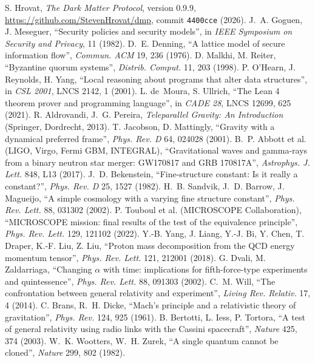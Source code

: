  S. Hrovat, \emph{The Dark Matter Protocol}, version 0.9.9, \url{https://github.com/StevenHrovat/dmp}, commit
\texttt{4400cce} (2026).
 J.~A. Goguen, J. Meseguer, ``Security policies and security models'', in \emph{IEEE Symposium on Security and Privacy}, 11
(1982).
 D.~E. Denning, ``A lattice model of secure information flow'', \emph{Commun. ACM} 19, 236 (1976).
 D. Malkhi, M. Reiter, ``Byzantine quorum systems'', \emph{Distrib. Comput.} 11, 203 (1998).
 P. O'Hearn, J. Reynolds, H. Yang, ``Local reasoning about programs that alter data structures'', in \emph{CSL 2001},
LNCS 2142, 1 (2001).
 L. de~Moura, S. Ullrich, ``The Lean 4 theorem prover and programming language'', in \emph{CADE 28}, LNCS 12699, 625
(2021).
 R. Aldrovandi, J.~G. Pereira, \emph{Teleparallel Gravity: An Introduction} (Springer, Dordrecht, 2013).
 T. Jacobson, D. Mattingly, ``Gravity with a dynamical preferred frame'', \emph{Phys. Rev. D} 64, 024028 (2001).
 B.~P. Abbott et al. (LIGO, Virgo, Fermi GBM, INTEGRAL), ``Gravitational waves and gamma-rays from a binary neutron
star merger: GW170817 and GRB 170817A'', \emph{Astrophys. J. Lett.} 848, L13 (2017).
 J.~D. Bekenstein, ``Fine-structure constant: Is it really a constant?'', \emph{Phys. Rev. D} 25, 1527 (1982).
 H.~B. Sandvik, J.~D. Barrow, J. Magueijo, ``A simple cosmology with a varying fine structure constant'', \emph{Phys. Rev.
Lett.} 88, 031302 (2002).
 P. Touboul et al. (MICROSCOPE Collaboration), ``MICROSCOPE mission: final results of the test of the equivalence
principle'', \emph{Phys. Rev. Lett.} 129, 121102 (2022).
 Y.-B. Yang, J. Liang, Y.-J. Bi, Y. Chen, T. Draper, K.-F. Liu, Z. Liu, ``Proton mass decomposition from the QCD energy
momentum tensor'', \emph{Phys. Rev. Lett.} 121, 212001 (2018).
 G. Dvali, M. Zaldarriaga, ``Changing $\alpha$ with time: implications for fifth-force-type experiments and quintessence'',
\emph{Phys. Rev. Lett.} 88, 091303 (2002).
 C.~M. Will, ``The confrontation between general relativity and experiment'', \emph{Living Rev. Relativ.} 17, 4 (2014).
 C. Brans, R.~H. Dicke, ``Mach's principle and a relativistic theory of gravitation'', \emph{Phys. Rev.} 124, 925 (1961).
 B. Bertotti, L. Iess, P. Tortora, ``A test of general relativity using radio links with the Cassini spacecraft'',
\emph{Nature} 425, 374 (2003).
 W.~K. Wootters, W.~H. Zurek, ``A single quantum cannot be cloned'', \emph{Nature} 299, 802 (1982).

